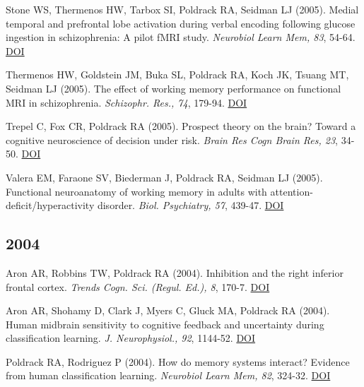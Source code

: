 Stone WS, Thermenos HW, Tarbox SI, Poldrack RA, Seidman LJ (2005). Medial temporal and prefrontal lobe activation during verbal encoding following glucose ingestion in schizophrenia: A pilot fMRI study. \textit{Neurobiol Learn Mem, 83}, 54-64. \href{http://dx.doi.org/10.1016/j.nlm.2004.07.009}{DOI} \vspace{2mm}

Thermenos HW, Goldstein JM, Buka SL, Poldrack RA, Koch JK, Tsuang MT, Seidman LJ (2005). The effect of working memory performance on functional MRI in schizophrenia. \textit{Schizophr. Res., 74}, 179-94. \href{http://dx.doi.org/10.1016/j.schres.2004.07.021}{DOI} \vspace{2mm}

Trepel C, Fox CR, Poldrack RA (2005). Prospect theory on the brain? Toward a cognitive neuroscience of decision under risk. \textit{Brain Res Cogn Brain Res, 23}, 34-50. \href{http://dx.doi.org/10.1016/j.cogbrainres.2005.01.016}{DOI} \vspace{2mm}

Valera EM, Faraone SV, Biederman J, Poldrack RA, Seidman LJ (2005). Functional neuroanatomy of working memory in adults with attention-deficit/hyperactivity disorder. \textit{Biol. Psychiatry, 57}, 439-47. \href{http://dx.doi.org/10.1016/j.biopsych.2004.11.034}{DOI} \vspace{2mm}

\subsection*{2004}

Aron AR, Robbins TW, Poldrack RA (2004). Inhibition and the right inferior frontal cortex. \textit{Trends Cogn. Sci. (Regul. Ed.), 8}, 170-7. \href{http://dx.doi.org/10.1016/j.tics.2004.02.010}{DOI} \vspace{2mm}

Aron AR, Shohamy D, Clark J, Myers C, Gluck MA, Poldrack RA (2004). Human midbrain sensitivity to cognitive feedback and uncertainty during classification learning. \textit{J. Neurophysiol., 92}, 1144-52. \href{http://dx.doi.org/10.1152/jn.01209.2003}{DOI} \vspace{2mm}

Poldrack RA, Rodriguez P (2004). How do memory systems interact? Evidence from human classification learning. \textit{Neurobiol Learn Mem, 82}, 324-32. \href{http://dx.doi.org/10.1016/j.nlm.2004.05.003}{DOI} \vspace{2mm}


